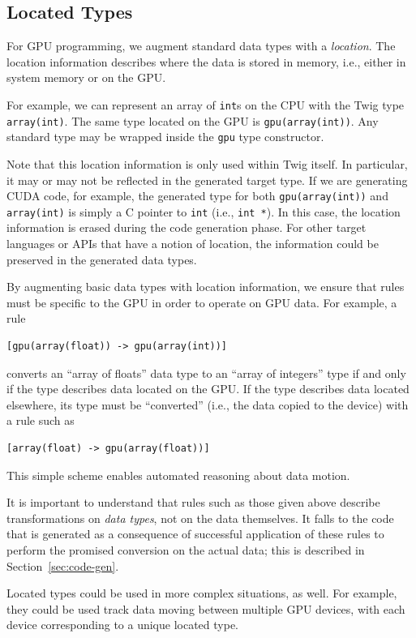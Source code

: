 \subsection{Located Types}
\label{sec:located-types}

For GPU programming, we augment standard data types with a  \emph{location}. The location information describes where the data is stored in memory, i.e., either in system memory or on the GPU.

For example, we can represent an array of \texttt{int}s on the CPU with the Twig type \texttt{array(int)}. The same type located on the GPU is \texttt{gpu(array(int))}. Any standard type may be wrapped inside the \texttt{gpu} type constructor.

Note that this location information is only used within Twig itself. In particular, it may or may not be reflected in the generated target type. If we are generating CUDA code, for example, the generated type for both \texttt{gpu(array(int))} and \texttt{array(int)} is simply a C pointer to \texttt{int} (i.e., \texttt{int *}). In this case, the location information is erased during the code generation phase. For other target languages or APIs that have a notion of location, the information could be preserved in the generated data types.

By augmenting basic data types with location information, we ensure that rules must be specific to the GPU in order to operate on GPU data. For example, a rule

\begin{verbatim}
[gpu(array(float)) -> gpu(array(int))]
\end{verbatim}

converts an ``array of floats'' data type to an ``array of integers'' type if and only if the type describes data located on the GPU. If the type describes data located elsewhere, its type must be ``converted'' (i.e., the data copied to the device) with a rule such as

\begin{verbatim}
[array(float) -> gpu(array(float))]
\end{verbatim}

This simple scheme enables automated reasoning about data motion.

It is important to understand that rules such as those given above describe transformations on \emph{data types}, not on the data themselves. It falls to the code that is generated as a consequence of successful application of these rules to perform the promised conversion on the actual data; this is described in Section~\ref{sec:code-gen}.

Located types could be used in more complex situations, as well. For example, they could be used track data moving between multiple GPU devices, with each device corresponding to a unique located type.
